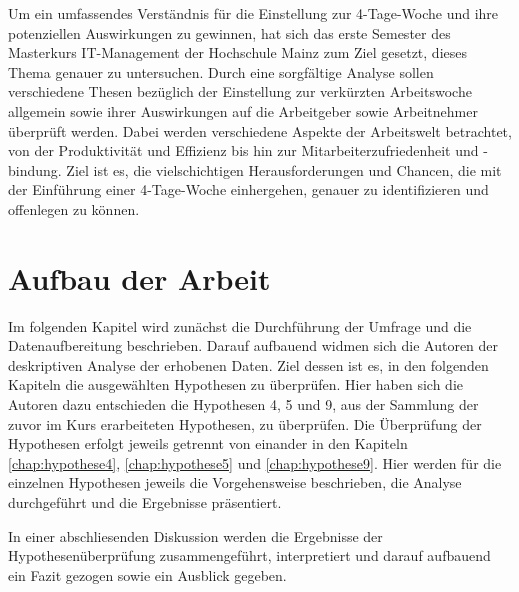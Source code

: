 Um ein umfassendes Verständnis für die Einstellung zur 4-Tage-Woche und ihre potenziellen Auswirkungen zu gewinnen, 
hat sich das erste Semester des Masterkurs IT-Management der Hochschule Mainz zum Ziel gesetzt, dieses Thema genauer zu untersuchen. 
Durch eine sorgfältige Analyse sollen verschiedene Thesen bezüglich der Einstellung zur verkürzten Arbeitswoche allgemein sowie 
ihrer Auswirkungen auf die Arbeitgeber sowie Arbeitnehmer überprüft werden. Dabei werden verschiedene Aspekte der Arbeitswelt 
betrachtet, von der Produktivität und Effizienz bis hin zur Mitarbeiterzufriedenheit und -bindung. Ziel ist es, die 
vielschichtigen Herausforderungen und Chancen, die mit der Einführung einer 4-Tage-Woche einhergehen, genauer zu identifizieren 
und offenlegen zu können.

\section{Aufbau der Arbeit}

Im folgenden Kapitel wird zunächst die Durchführung der Umfrage und die Datenaufbereitung beschrieben. Darauf aufbauend widmen sich die Autoren der deskriptiven Analyse der erhobenen Daten.
Ziel dessen ist es, in den folgenden Kapiteln die ausgewählten Hypothesen zu überprüfen. Hier haben sich die Autoren dazu entschieden die Hypothesen 4, 5 und 9, aus der Sammlung der zuvor
im Kurs erarbeiteten Hypothesen, zu überprüfen.
Die Überprüfung der Hypothesen erfolgt jeweils getrennt von einander in den Kapiteln \ref{chap:hypothese4}, \ref{chap:hypothese5} und \ref{chap:hypothese9}. Hier werden für die einzelnen Hypothesen
jeweils die Vorgehensweise beschrieben, die Analyse durchgeführt und die Ergebnisse präsentiert.


In einer abschliesenden Diskussion werden die Ergebnisse der Hypothesenüberprüfung zusammengeführt, interpretiert und darauf aufbauend ein Fazit gezogen sowie ein Ausblick gegeben.